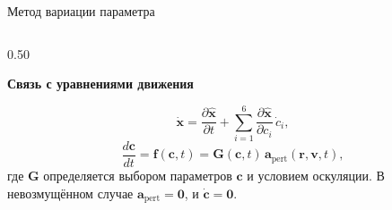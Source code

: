 \documentclass[8pt]{beamer}
\begin{document}
\begin{frame}{Метод вариации параметра}
\begin{columns}
\begin{column}{0.50\textwidth}
    \begin{center}
        \textbf{Связь с уравнениями движения}
    \end{center}
    \begin{equation*}
        \dot{\mathbf{x}} = \frac{\partial \hat{\mathbf{x}}}{\partial t} + \sum_{i=1}^{6} \frac{\partial \hat{\mathbf{x}}}{\partial c_i}\,\dot c_i,
    \end{equation*}
    \begin{equation*}
        \frac{d\mathbf{c}}{dt} 
        = \mathbf{f}(\mathbf{c}, t) 
        = \mathbf{G}(\mathbf{c}, t)\,\mathbf{a}_{\text{pert}}(\mathbf{r}, \mathbf{v}, t),
    \end{equation*}
    где $\mathbf{G}$ определяется выбором параметров $\mathbf{c}$ и условием оскуляции.
    В невозмущённом случае $\mathbf{a}_{\text{pert}} = \mathbf{0}$, и $\dot{\mathbf{c}} = \mathbf{0}$.
    \end{column}
\end{columns}
\end{frame}
\end{document}
